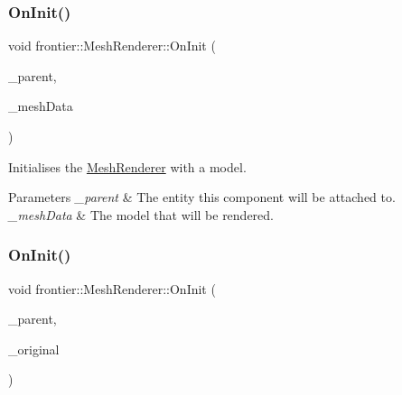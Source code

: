 \mbox{\label{classfrontier_1_1_mesh_renderer_a3137cee27f2c38b49d31b7e944f8755c}} 
\subsubsection{\texorpdfstring{On\+Init()}{OnInit()}\hspace{0.1cm}{\footnotesize\ttfamily [1/2]}}
{\footnotesize\ttfamily void frontier\+::\+Mesh\+Renderer\+::\+On\+Init (\begin{DoxyParamCaption}\item[{std\+::weak\+\_\+ptr$<$ \hyperlink{classfrontier_1_1_entity}{Entity} $>$}]{\+\_\+parent,  }\item[{std\+::shared\+\_\+ptr$<$ \hyperlink{classfrontier_1_1_model}{Model} $>$}]{\+\_\+mesh\+Data }\end{DoxyParamCaption})}



Initialises the \hyperlink{classfrontier_1_1_mesh_renderer}{Mesh\+Renderer} with a model. 


\begin{DoxyParams}{Parameters}
{\em \+\_\+parent} & The entity this component will be attached to. \\
\hline
{\em \+\_\+mesh\+Data} & The model that will be rendered. \\
\hline
\end{DoxyParams}
\mbox{\label{classfrontier_1_1_mesh_renderer_a27e5a0fdf24ffdae6555f2d132adf3f4}} 
\subsubsection{\texorpdfstring{On\+Init()}{OnInit()}\hspace{0.1cm}{\footnotesize\ttfamily [2/2]}}
{\footnotesize\ttfamily void frontier\+::\+Mesh\+Renderer\+::\+On\+Init (\begin{DoxyParamCaption}\item[{std\+::weak\+\_\+ptr$<$ \hyperlink{classfrontier_1_1_entity}{Entity} $>$}]{\+\_\+parent,  }\item[{std\+::weak\+\_\+ptr$<$ \hyperlink{classfrontier_1_1_mesh_renderer}{Mesh\+Renderer} $>$}]{\+\_\+original }\end{DoxyParamCaption})}



